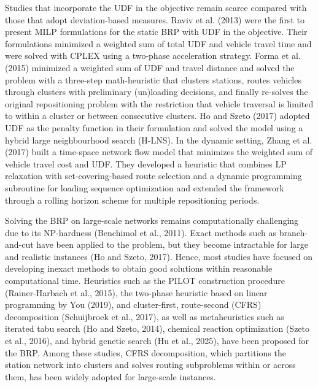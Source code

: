\documentclass[11pt]{article}
\numberwithin{table}{section}
\numberwithin{figure}{section}
\begin{document}
Studies that incorporate the UDF in the objective remain scarce compared with those that adopt deviation-based measures. Raviv et al. (2013) were the first to present MILP formulations for the static BRP with UDF in the objective. Their formulations minimized a weighted sum of total UDF and vehicle travel time and were solved with CPLEX using a two-phase acceleration strategy. Forma et al. (2015) minimized a weighted sum of UDF and travel distance and solved the problem with a three-step math-heuristic that clusters stations, routes vehicles through clusters with preliminary (un)loading decisions, and finally re-solves the original repositioning problem with the restriction that vehicle traversal is limited to within a cluster or between consecutive clusters. Ho and Szeto (2017) adopted UDF as the penalty function in their formulation and solved the model using a hybrid large neighbourhood search (H-LNS). In the dynamic setting, Zhang et al. (2017) built a time-space network flow model that minimizes the weighted sum of vehicle travel cost and UDF. They developed a heuristic that combines LP relaxation with set-covering-based route selection and a dynamic programming subroutine for loading sequence optimization and extended the framework through a rolling horizon scheme for multiple repositioning periods.

Solving the BRP on large-scale networks remains computationally challenging due to its NP-hardness (Benchimol et al., 2011). Exact methods such as branch-and-cut have been applied to the problem, but they become intractable for large and realistic instances (Ho and Szeto, 2017). Hence, most studies have focused on developing inexact methods to obtain good solutions within reasonable computational time. Heuristics such as the PILOT construction procedure (Rainer-Harbach et al., 2015), the two-phase heuristic based on linear programming by You (2019), and cluster-first, route-second (CFRS) decomposition (Schuijbroek et al., 2017), as well as metaheuristics such as iterated tabu search (Ho and Szeto, 2014), chemical reaction optimization (Szeto et al., 2016), and hybrid genetic search (Hu et al., 2025), have been proposed for the BRP. Among these studies, CFRS decomposition, which partitions the station network into clusters and solves routing subproblems within or across them, has been widely adopted for large-scale instances.
\end{document}
